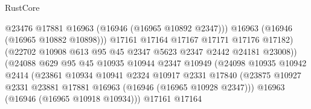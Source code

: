 \begin{lexlean}{RustCore}
\begin{coremodule}
                                            @23476
                                            @17881
                                            @16963
                                            (@16946 (@16965 @10892 @2347)))
                                          @16963
                                          (@16946 (@16965 @10882 @10898)))
                                        @17161
                                        @17164
                                        @17167
                                        @17171
                                        @17176
                                        @17182)
                                      (@22702
                                        @10908
                                        @613
                                        @95
                                        @45
                                        @2347
                                        @5623
                                        @2347
                                        @2442
                                        @24181
                                        @23008))
                                    (@24088
                                      @629
                                      @95
                                      @45
                                      @10935
                                      @10944
                                      @2347
                                      @10949
                                      (@24098
                                        @10935
                                        @10942
                                        @2414
                                        (@23861
                                          @10934
                                          @10941
                                          @2324
                                          @10917
                                          @2331
                                          @17840
                                          (@23875
                                            @10927
                                            @2331
                                            @23881
                                            @17881
                                            @16963
                                            (@16946 (@16965 @10928 @2347)))
                                          @16963
                                          (@16946 (@16965 @10918 @10934)))
                                        @17161
                                        @17164

\end{coremodule}
\end{lexlean}
